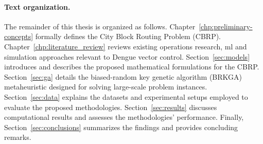 
\paragraph{Text organization.}  
The remainder of this thesis is organized as follows. 
Chapter~\ref{chp:preliminary-concepts} formally defines the City Block Routing Problem (CBRP).
Chapter~\ref{chp:literature_review} reviews existing operations research, \gls{ml} and simulation approaches relevant to Dengue vector control.
Section~\ref{sec:models} introduces and describes the proposed mathematical formulations for the CBRP. 
Section~\ref{sec:ga} details the biased-random key genetic algorithm (BRKGA) metaheuristic designed for solving large-scale problem instances.
Section~\ref{sec:data} explains the datasets and experimental setups employed to evaluate the proposed methodologies. 
Section~\ref{sec:results} discusses computational results and assesses the methodologies' performance. 
Finally, Section~\ref{sec:conclusions} summarizes the findings and provides concluding remarks.
